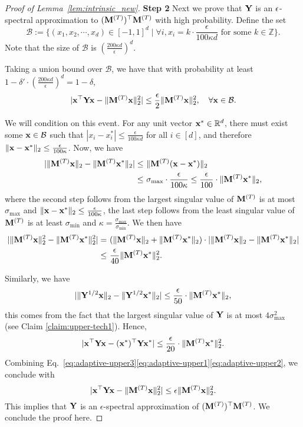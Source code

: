 \begin{proof}[Proof of Lemma~\ref{lem:intrinsic_new}]
\vspace{+2mm}
{\bf Step 2} Next we prove that $\mathbf{Y}$ is an $\epsilon$-spectral approximation to $(\mathbf{M}^{(T)})^\top \mathbf{M}^{(T)}$ with high probability.
Define the set 
\[
\mathcal{B} := \{(x_1, x_2, \cdots, x_d) \in [-1, 1]^d \mid \forall i, x_i = k \cdot \frac{\epsilon}{100 \kappa d} \text{ for some } k \in \mathbb{Z}\}.
\]
Note that the size of $\mathcal{B}$ is $(\frac{200 \kappa d}{\epsilon})^d$.


Taking a union bound over $\mathcal{B}$, we have that with probability at least $1 - \delta' \cdot (\frac{200 \kappa d}{\epsilon})^d = 1 - \delta$, 
\begin{align}
|\mathbf{x}^{\top} \mathbf{Y} \mathbf{x} - \|\mathbf{M}^{(T)} \mathbf{x}\|_2^2 | \leq \frac{\epsilon}{2} \|\mathbf{M}^{(T)} \mathbf{x}\|_2^2, \quad \forall \mathbf{x} \in \mathcal{B}.\label{eq:adaptive-upper3}
\end{align}

We will condition on this event. For any unit vector $\mathbf{x}^{*} \in \mathbb{R}^{d}$, there must exist some $\mathbf{x} \in \mathcal{B}$ such that $|x_i - x^*_i| \leq \frac{\epsilon}{100 \kappa d}$ for all $i \in [d]$, and therefore $\|\mathbf{x} - \mathbf{x}^*\|_2 \leq \frac{\epsilon}{100 \kappa}$.  
Now, we have
\begin{align*}
|\|\mathbf{M}^{(T)} \mathbf{x}\|_2 - \|\mathbf{M}^{(T)} \mathbf{x}^*\|_2| \leq &~ \|\mathbf{M}^{(T)} (\mathbf{x} - \mathbf{x}^*)\|_2 \\
\leq &~ \sigma_{\max} \cdot \frac{\epsilon}{100 \kappa} \leq \frac{\epsilon}{100} \cdot \|\mathbf{M}^{(T)} \mathbf{x}^{*}\|_2,
\end{align*}
where the second step follows from the largest singular value of $\mathbf{M}^{(T)}$ is at most $\sigma_{\max}$ and $\|\mathbf{x} - \mathbf{x}^*\|_2 \leq \frac{\epsilon}{100 \kappa}$, the last step follows from the least singular value of $\mathbf{M}^{(T)}$ is at least $\sigma_{\min}$ and $\kappa = \frac{\sigma_{\max}}{\sigma_{\min}}$. We then have 
\begin{align}
|\|\mathbf{M}^{(T)} \mathbf{x}\|_2^2 - \|\mathbf{M}^{(T)} \mathbf{x}^*\|_2^2| = &~ (\|\mathbf{M}^{(T)} \mathbf{x}\|_2 + \|\mathbf{M}^{(T)} \mathbf{x}^*\|_2) \cdot |\|\mathbf{M}^{(T)} \mathbf{x}\|_2 - \|\mathbf{M}^{(T)} \mathbf{x}^*\|_2| \notag \\
\leq &~ \frac{\epsilon}{40} \|\mathbf{M}^{(T)} \mathbf{x}^{*}\|_2^2.\label{eq:adaptive-upper1}
\end{align}

Similarly, we have 
\[
|\|\mathbf{Y}^{1/2} \mathbf{x}\|_2 - \|\mathbf{Y}^{1/2} \mathbf{x}^*\|_2| \leq \frac{\epsilon}{50} \cdot \|\mathbf{M}^{(T)} \mathbf{x}^{*}\|_2,
\]
this comes from the fact that the largest singular value of $\mathbf{Y}$ is at most $4 \sigma_{\max}^2$ (see Claim \ref{claim:upper-tech1}). Hence, 
\begin{align}
\label{eq:adaptive-upper2}
|\mathbf{x}^{\top} \mathbf{Y} \mathbf{x} - (\mathbf{x}^*)^{\top} \mathbf{Y} \mathbf{x}^*| \leq \frac{\epsilon}{20} \cdot \|\mathbf{M}^{(T)} \mathbf{x}^{*}\|_2^2.
\end{align}
Combining Eq.~\eqref{eq:adaptive-upper3}\eqref{eq:adaptive-upper1}\eqref{eq:adaptive-upper2}, we conclude with
\[
|\mathbf{x}^{\top} \mathbf{Y} \mathbf{x} - \|\mathbf{M}^{(T)} \mathbf{x}\|_2^2 | \leq \epsilon \|\mathbf{M}^{(T)} \mathbf{x}\|_2^2.
\]
This implies that $\mathbf{Y}$ is an $\epsilon$-spectral approximation of $(\mathbf{M}^{(T)})^{\top} \mathbf{M}^{(T)}$. We conclude the proof here.
\end{proof}






